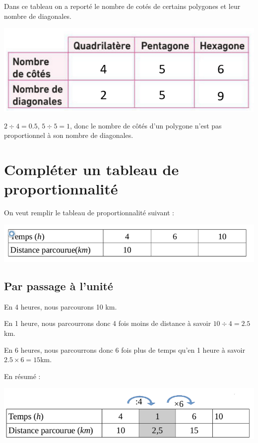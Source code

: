 \documentclass[12pt,a4paper]{article}
\begin{document}
\begin{myex}	
		Dans ce tableau on a reporté le nombre de cotés de certains polygones et leur nombre de diagonales.
		
		\begin{center}
			\includegraphics[scale=0.5]{tab2}
		\end{center}
	
		$2 \div 4 = \num{0.5}$, $5 \div 5 = 1$, donc le nombre de côtés d'un polygone n'est pas proportionnel à son nombre de diagonales.	
	
\end{myex}

\section{Compléter un tableau de proportionnalité}

\begin{myex}
	On veut remplir le tableau de proportionnalité suivant :
	
	\begin{center}
		\includegraphics[scale=0.5]{tab3_1}
	\end{center}
\end{myex}


\subsection{Par passage à l'unité}


\begin{mymeth}
	En 4 heures, nous parcourons 10 km.
	
	En 1 heure, nous parcourrons donc 4 fois moins de distance à savoir $10 \div 4 = \num{2.5}$ km.
	
	En 6 heures, nous parcourrons donc 6 fois plus de temps qu’en 1 heure à savoir $\num{2.5} \times 6 = 15 $km.
	
	En résumé :
	
	
	\begin{center}
		\includegraphics[scale=0.5]{tab3_2}
	\end{center}
\end{mymeth}
\end{document}
